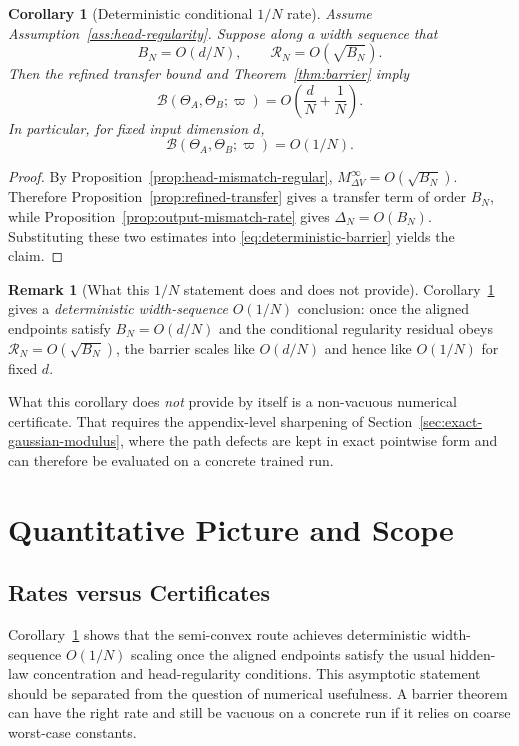 \documentclass[11pt]{article}
\newtheorem{corollary}[theorem]{Corollary}
\theoremstyle{definition}
\newtheorem{remark}[theorem]{Remark}
\newcommand{\mc}[1]{\mathcal{#1}}
\newcommand{\cB}{\mathcal{B}}
\begin{document}
\begin{corollary}[Deterministic conditional $1/N$ rate]
\label{cor:deterministic-fast-rate}
Assume Assumption~\ref{ass:head-regularity}. Suppose along a width sequence
that
\[
  B_N=O(d/N),
  \qquad
  \mc{R}_N=O(\sqrt{B_N}).
\]
Then the refined transfer bound and Theorem~\ref{thm:barrier} imply
\[
  \cB(\Theta_A,\Theta_B;\varpi)
  =
  O\!\left(\frac{d}{N}+\frac1N\right).
\]
In particular, for fixed input dimension $d$,
\[
  \cB(\Theta_A,\Theta_B;\varpi)=O(1/N).
\]
\end{corollary}

\begin{proof}
By Proposition~\ref{prop:head-mismatch-regular},
$M_{\Delta V}^\infty=O(\sqrt{B_N})$. Therefore
Proposition~\ref{prop:refined-transfer} gives a transfer term of order $B_N$,
while Proposition~\ref{prop:output-mismatch-rate} gives $\Delta_N=O(B_N)$.
Substituting these two estimates into
\eqref{eq:deterministic-barrier} yields the claim.
\end{proof}

\begin{remark}[What this $1/N$ statement does and does not provide]
\label{rem:rate-vs-instantiation}
Corollary~\ref{cor:deterministic-fast-rate} gives a \emph{deterministic
width-sequence} $O(1/N)$ conclusion: once the aligned
endpoints satisfy $B_N=O(d/N)$ and the conditional regularity residual obeys
$\mc{R}_N=O(\sqrt{B_N})$, the barrier scales like $O(d/N)$ and hence like
$O(1/N)$ for fixed $d$.

What this corollary does \emph{not} provide by itself is a non-vacuous
numerical certificate. That requires the appendix-level sharpening of
Section~\ref{sec:exact-gaussian-modulus}, where the path defects are kept in exact
pointwise form and can therefore be evaluated on a concrete trained run.
\end{remark}

\section{Quantitative Picture and Scope}
\label{sec:discussion}

\subsection{Rates versus Certificates}

Corollary~\ref{cor:deterministic-fast-rate} shows that the semi-convex route
achieves deterministic width-sequence $O(1/N)$ scaling once the aligned
endpoints satisfy the usual hidden-law concentration and head-regularity
conditions. This asymptotic statement should be separated from the question of
numerical usefulness. A barrier theorem can have the right
rate and still be vacuous on a concrete run if it relies on coarse worst-case
constants.
\end{document}
